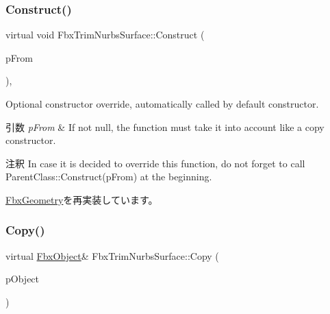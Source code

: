 \mbox{\label{class_fbx_trim_nurbs_surface_a95ea54578a57e9038ae67cb2b6b26f82}} 
\subsubsection{\texorpdfstring{Construct()}{Construct()}}
{\footnotesize\ttfamily virtual void Fbx\+Trim\+Nurbs\+Surface\+::\+Construct (\begin{DoxyParamCaption}\item[{const \hyperlink{class_fbx_object}{Fbx\+Object} $\ast$}]{p\+From }\end{DoxyParamCaption})\hspace{0.3cm}{\ttfamily [protected]}, {\ttfamily [virtual]}}

Optional constructor override, automatically called by default constructor. 
\begin{DoxyParams}{引数}
{\em p\+From} & If not null, the function must take it into account like a copy constructor. \\
\hline
\end{DoxyParams}
\begin{DoxyRemark}{注釈}
In case it is decided to override this function, do not forget to call Parent\+Class\+::\+Construct(p\+From) at the beginning. 
\end{DoxyRemark}


\hyperlink{class_fbx_geometry_a26ca96a86f17783c45ff83b33d2b5324}{Fbx\+Geometry}を再実装しています。

\mbox{\label{class_fbx_trim_nurbs_surface_a4407d30e83346ab3cb30ccf67d7bb289}} 
\subsubsection{\texorpdfstring{Copy()}{Copy()}}
{\footnotesize\ttfamily virtual \hyperlink{class_fbx_object}{Fbx\+Object}\& Fbx\+Trim\+Nurbs\+Surface\+::\+Copy (\begin{DoxyParamCaption}\item[{const \hyperlink{class_fbx_object}{Fbx\+Object} \&}]{p\+Object }\end{DoxyParamCaption})\hspace{0.3cm}{\ttfamily [virtual]}}

